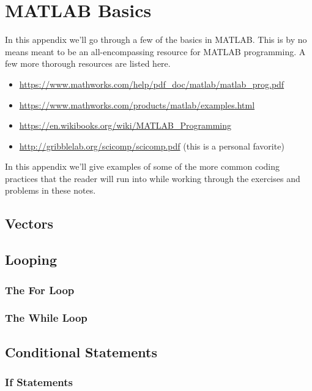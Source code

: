 \chapter{MATLAB Basics}
In this appendix we'll go through a few of the basics in MATLAB.  This is by no means
meant to be an all-encompassing resource for MATLAB programming.  A few more thorough
resources are listed here.
\begin{itemize}
    \item \href{https://www.mathworks.com/help/pdf_doc/matlab/matlab_prog.pdf}{https://www.mathworks.com/help/pdf\_doc/matlab/matlab\_prog.pdf}
    \item
        \href{https://www.mathworks.com/products/matlab/examples.html}{https://www.mathworks.com/products/matlab/examples.html}
    \item
        \href{https://en.wikibooks.org/wiki/MATLAB_Programming}{https://en.wikibooks.org/wiki/MATLAB\_Programming}
    \item
        \href{http://gribblelab.org/scicomp/scicomp.pdf}{http://gribblelab.org/scicomp/scicomp.pdf}
        (this is a personal favorite)
\end{itemize}

In this appendix we'll give examples of some of the more common coding practices that the
reader will run into while working through the exercises and problems in these notes.  

\section{Vectors}

\section{Looping}
\subsection{The For Loop}

\subsection{The While Loop}


\section{Conditional Statements}
\subsection{If Statements}

